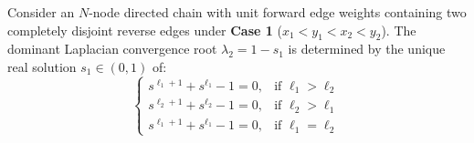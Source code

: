 \begin{theo}\label{Theoremcase1}
Consider an $N$-node directed chain with unit forward edge weights containing two completely disjoint reverse edges under \textbf{Case 1} ($x_1 < y_1 < x_2 < y_2$). The dominant Laplacian convergence root $\lambda_2 = 1 - s_1$ is determined by the unique real solution $s_1 \in (0,1)$ of:
\begin{equation}\label{eq:case1_theorem_statement}
	\begin{cases}
		s^{\ell_1+1} + s^{\ell_1} - 1 = 0, & \text{if } \ell_1 > \ell_2 \\
		s^{\ell_2+1} + s^{\ell_2} - 1 = 0, & \text{if } \ell_2 > \ell_1 \\
		s^{\ell_1+1} + s^{\ell_1} - 1 = 0, & \text{if } \ell_1 = \ell_2
	\end{cases}
\end{equation}
\end{theo}

